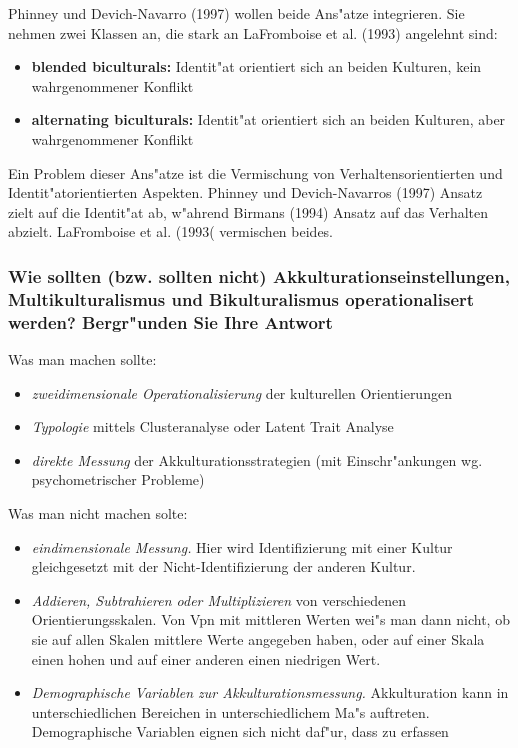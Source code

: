 \noindent Phinney und Devich-Navarro (1997) wollen beide Ans"atze integrieren. Sie nehmen zwei Klassen an, die stark an LaFromboise et al. (1993) angelehnt sind:
\begin{itemize}
        \item \textbf{blended biculturals:} Identit"at orientiert sich an beiden Kulturen, kein wahrgenommener Konflikt
        \item \textbf{alternating biculturals:} Identit"at orientiert sich an beiden Kulturen, aber wahrgenommener Konflikt
\end{itemize}

Ein Problem dieser Ans"atze ist  die Vermischung von Verhaltensorientierten und Identit"atorientierten Aspekten. Phinney und Devich-Navarros (1997) Ansatz zielt auf die Identit"at ab, w"ahrend Birmans (1994) Ansatz auf das Verhalten abzielt. LaFromboise et al. (1993( vermischen beides. 

\subsubsection{Wie sollten (bzw. sollten nicht) Akkulturationseinstellungen, Multikulturalismus und Bikulturalismus operationalisert werden? Bergr"unden Sie Ihre Antwort}

Was man machen sollte:
\begin{itemize}
        \item \emph{zweidimensionale Operationalisierung} der kulturellen Orientierungen
        \item \emph{Typologie} mittels Clusteranalyse oder Latent Trait Analyse
        \item \emph{direkte Messung} der Akkulturationsstrategien (mit Einschr"ankungen wg. psychometrischer Probleme)
\end{itemize}

\noindent Was man nicht machen solte:
\begin{itemize}
        \item \emph{eindimensionale Messung.} Hier wird Identifizierung mit einer Kultur gleichgesetzt mit der Nicht-Identifizierung der anderen Kultur.
        \item \emph{Addieren, Subtrahieren oder Multiplizieren} von verschiedenen Orientierungsskalen. Von Vpn mit mittleren Werten wei"s man dann nicht, ob sie auf allen Skalen mittlere Werte angegeben haben, oder auf einer Skala einen hohen  und auf einer anderen einen niedrigen Wert.
        \item \emph{Demographische Variablen zur Akkulturationsmessung.} Akkulturation kann in unterschiedlichen Bereichen in unterschiedlichem Ma"s auftreten. Demographische Variablen eignen sich nicht daf"ur, dass zu erfassen 
\end{itemize}

